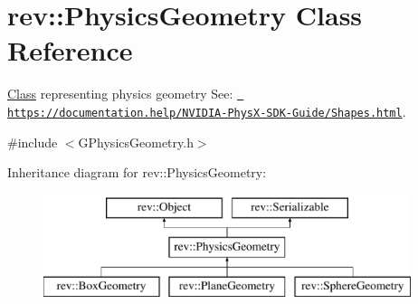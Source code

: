 \hypertarget{classrev_1_1_physics_geometry}{}\section{rev\+::Physics\+Geometry Class Reference}
\label{classrev_1_1_physics_geometry}


\mbox{\hyperlink{struct_class}{Class}} representing physics geometry See\+: \href{https://documentation.help/NVIDIA-PhysX-SDK-Guide/Shapes.html}{\texttt{ https\+://documentation.\+help/\+N\+V\+I\+D\+I\+A-\/\+Phys\+X-\/\+S\+D\+K-\/\+Guide/\+Shapes.\+html}}.  




{\ttfamily \#include $<$G\+Physics\+Geometry.\+h$>$}

Inheritance diagram for rev\+::Physics\+Geometry\+:\begin{figure}[H]
\begin{center}
\leavevmode
\includegraphics[height=3.000000cm]{classrev_1_1_physics_geometry}
\end{center}
\end{figure}
